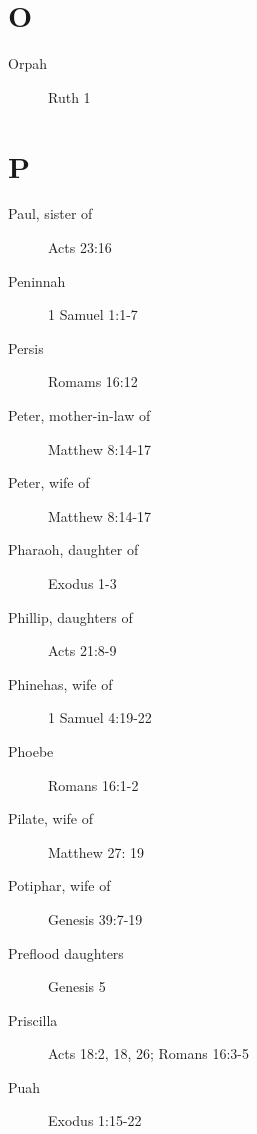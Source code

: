 \documentclass[12pt,letter,twoside,openany]{extbook}
\begin{document}
\chapter*{O}
\begin{description}
	\item [Orpah] Ruth 1
\end{description}

\chapter*{P}
\begin{description}
	\item [Paul, sister of] Acts 23:16
	\item [Peninnah] 1 Samuel 1:1-7
	\item [Persis] Romams 16:12
	\item [Peter, mother-in-law of] Matthew 8:14-17
	\item [Peter, wife of]  Matthew 8:14-17
	\item [Pharaoh, daughter of] Exodus 1-3
	\item [Phillip, daughters of] Acts 21:8-9
	\item [Phinehas, wife of] 1 Samuel 4:19-22
	\item [Phoebe] Romans 16:1-2
	\item [Pilate, wife of] Matthew 27:	19
	\item [Potiphar, wife of] Genesis 39:7-19
	\item [Preflood daughters\footnotemark{}] Genesis 5
	\item [Priscilla] Acts 18:2, 18, 26; Romans 16:3-5
	\item [Puah] Exodus 1:15-22
\end{description}

\end{document}
